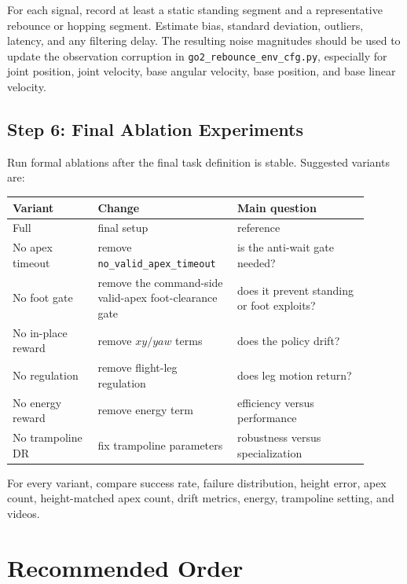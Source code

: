 \documentclass[11pt, a4paper]{article}
\begin{document}
For each signal, record at least a static standing segment and a representative
rebounce or hopping segment. Estimate bias, standard deviation, outliers,
latency, and any filtering delay. The resulting noise magnitudes should be used
to update the observation corruption in \texttt{go2\_rebounce\_env\_cfg.py},
especially for joint position, joint velocity, base angular velocity, base
position, and base linear velocity.

\subsection{Step 6: Final Ablation Experiments}

Run formal ablations after the final task definition is stable. Suggested
variants are:
\begin{center}
\begin{tabular}{p{0.22\linewidth}p{0.34\linewidth}p{0.34\linewidth}}
\hline
Variant & Change & Main question \\
\hline
Full & final setup & reference \\
No apex timeout & remove \texttt{no\_valid\_apex\_timeout} & is the anti-wait gate needed? \\
No foot gate & remove the command-side valid-apex foot-clearance gate & does it prevent standing or foot exploits? \\
No in-place reward & remove $xy/yaw$ terms & does the policy drift? \\
No regulation & remove flight-leg regulation & does leg motion return? \\
No energy reward & remove energy term & efficiency versus performance \\
No trampoline DR & fix trampoline parameters & robustness versus specialization \\
\hline
\end{tabular}
\end{center}

For every variant, compare success rate, failure distribution, height error,
apex count, height-matched apex count, drift metrics, energy, trampoline
setting, and videos.

\section{Recommended Order}
\end{document}

